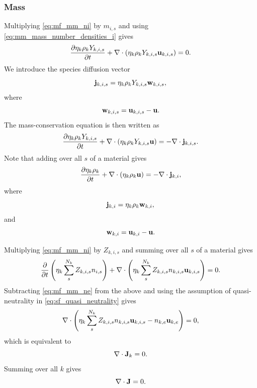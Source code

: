 \documentclass[a4paper,11pt]{report}
\begin{document}
\subsubsection{Mass}

Multiplying \cref{eq:mf_mm_ni} by $m_{i,s}$ and using \cref{eq:mm_mass_number_densities_i} gives
\begin{equation*}
    \frac{\partial \eta_k \rho_k Y_{k,i,s}}{\partial t} + \nabla \cdot \left( \eta_k \rho_k Y_{k,i,s} \mathbf{u}_{k,i,s} \right) = 0.
\end{equation*}
We introduce the species diffusion vector
\begin{equation}
    \label{eq:sf_species_diffusion_vector}
    \mathbf{j}_{k,i,s} = \eta_k \rho_k Y_{k,i,s} \mathbf{w}_{k,i,s},
\end{equation}
where 
\begin{equation}
    \label{eq:sf_species_velocity_shift}
    \mathbf{w}_{k,i,s} = \mathbf{u}_{k,i,s} - \mathbf{u}.
\end{equation}
The mass-conservation equation is then written as
\begin{equation*}
    \frac{\partial \eta_k \rho_k Y_{k,i,s}}{\partial t} + \nabla \cdot \left( \eta_k \rho_k Y_{k,i,s} \mathbf{u} \right) = -\nabla \cdot \mathbf{j}_{k,i,s}.
\end{equation*}
Note that adding over all $s$ of a material gives
\begin{equation*}
    \frac{\partial \eta_k \rho_k }{\partial t} + \nabla \cdot \left( \eta_k \rho_k \mathbf{u} \right) = -\nabla \cdot \mathbf{j}_{k,i},
\end{equation*}
where 
\begin{equation}
    \label{eq:sf_species_diffusion_vector_sum}
    \mathbf{j}_{k,i} = \eta_k \rho_k \mathbf{w}_{k,i},
\end{equation}
and
\begin{equation}
    \label{eq:sf_species_velocity_shift_sum}
    \mathbf{w}_{k,i} = \mathbf{u}_{k,i} - \mathbf{u}.
\end{equation}

Multiplying \cref{eq:mf_mm_ni} by $Z_{k,i,s}$ and summing over all $s$ of a material gives
\begin{equation*}
    \frac{\partial}{\partial t} \left( \eta_k \sum_s^{N_k} Z_{k,i,s} n_{i,s} \right) + \nabla \cdot \left( \eta_k \sum_s^{N_k} Z_{k,i,s} n_{k,i,s} \mathbf{u}_{k,i,s} \right) = 0.
\end{equation*}
Subtracting \cref{eq:mf_mm_ne} from the above and using the assumption of quasi-neutrality in \cref{eq:sf_quasi_neutrality} gives
\begin{equation*}
    \nabla \cdot \left( \eta_k \sum_s^{N_k} Z_{k,i,s} n_{k,i,s} \mathbf{u}_{k,i,s} - n_{k,e} \mathbf{u}_{k,e} \right) = 0,
\end{equation*}
which is equivalent to
\begin{equation*}
    \nabla \cdot \mathbf{J}_k = 0.
\end{equation*}
Summing over all $k$ gives
\begin{equation*}
    \nabla \cdot \mathbf{J} = 0.
\end{equation*}
\end{document}
